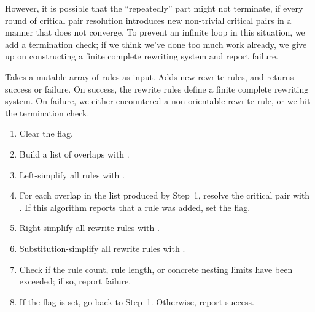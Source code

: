 \documentclass[../generics]{subfiles}
\begin{document}
However, it is possible that the ``repeatedly'' part might not terminate, if every round of critical pair resolution introduces new non-trivial critical pairs in a manner that does not converge. To prevent an infinite loop in this situation, we add a termination check; if we think we've done too much work already, we give up on constructing a finite complete rewriting system and report failure.

\begin{algorithm}\label{alg:knuthbendix} Takes a mutable array of rules as input. Adds new rewrite rules, and returns success or failure. On success, the rewrite rules define a finite complete rewriting system. On failure, we either encountered a non-orientable rewrite rule, or we hit the termination check.
\begin{enumerate}
\item Clear the flag.
\item Build a list of overlaps with .
\item Left-simplify all rules with .
\item For each overlap in the list produced by Step~1, resolve the critical pair with . If this algorithm reports that a rule was added, set the flag.
\item Right-simplify all rewrite rules with .
\item Substitution-simplify all rewrite rules with .
\item Check if the rule count, rule length, or concrete nesting limits have been exceeded; if so, report failure.
\item If the flag is set, go back to Step~1. Otherwise, report success.
\end{enumerate}
\end{algorithm}
\end{document}
